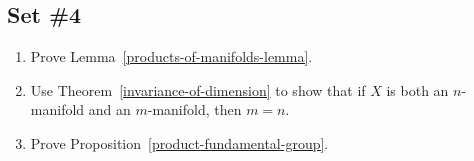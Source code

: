 \subsection{Set \#4}
\begin{enumerate}[label=4.\arabic*]
  \item \label{products-of-manifolds-exercise} Prove Lemma~\ref{products-of-manifolds-lemma}.
  \item \label{invariance-of-dimension-manifolds} Use Theorem~\ref{invariance-of-dimension} to show that if $X$ is both an $n$-manifold and an $m$-manifold, then $m = n$.
  \item \label{product-fundamental-group-exercise} Prove Proposition~\ref{product-fundamental-group}.
\end{enumerate}
